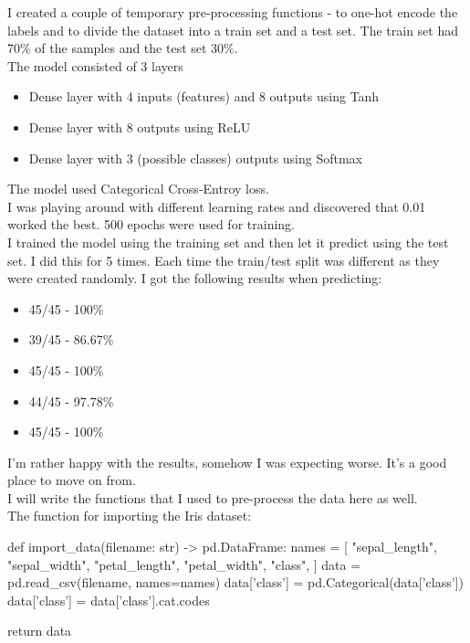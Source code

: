 \documentclass{article}
\begin{document}
I created a couple of temporary pre-processing functions - to one-hot encode the labels 
and to divide the dataset into a train set and a test set. The train set had 70\% of the
samples and the test set 30\%. \\

The model consisted of 3 layers
\begin{itemize}
    \item Dense layer with 4 inputs (features) and 8 outputs using Tanh 
    \item Dense layer with 8 outputs using ReLU
    \item Dense layer with 3 (possible classes) outputs using Softmax
\end{itemize}

The model used Categorical Cross-Entroy loss. \\

I was playing around with different learning rates and discovered that 
0.01 worked the best. 500 epochs were used for training. \\

I trained the model using the training set and then let it predict using the test set. I did this for
5 times. Each time the train/test split was different as they were created randomly. I got the following results when predicting:
\begin{itemize}
    \item 45/45 - 100\%
    \item 39/45 - 86.67\%
    \item 45/45 - 100\%
    \item 44/45 - 97.78\%
    \item 45/45 - 100\%
\end{itemize}

I'm rather happy with the results, somehow I was expecting worse. It's a good place to 
move on from. \\
I will write the functions that I used to pre-process the data here as well. \\

The function for importing the Iris dataset:
\begin{python}
def import_data(filename: str) -> pd.DataFrame:
    names = [
        "sepal_length",
        "sepal_width",
        "petal_length",
        "petal_width",
        "class",
    ]
    data = pd.read_csv(filename, names=names)
    data['class'] = pd.Categorical(data['class'])
    data['class'] = data['class'].cat.codes

    return data
\end{python}
\end{document}
